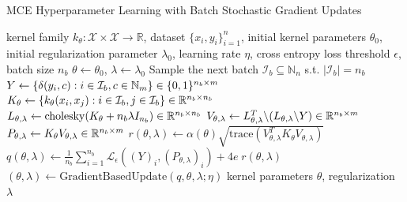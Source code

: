 \documentclass{llncs}
\begin{document}
	\begin{algorithm}[tb]
		\caption{\gls{MCE} Hyperparameter Learning with Batch Stochastic Gradient Updates}
		\label{alg:multiclass_conditional_embedding_training}
		\begin{algorithmic}[1]
			 kernel family $k_{\theta} : \mathcal{X} \times \mathcal{X} \to \mathbb{R}$, dataset $\{x_{i}, y_{i}\}_{i = 1}^{n}$, initial kernel parameters $\theta_{0}$, initial regularization parameter $\lambda_{0}$, learning rate $\eta$, cross entropy loss threshold $\epsilon$, batch size $n_{b}$
			\STATE $\theta \leftarrow \theta_{0}$, $\lambda \leftarrow \lambda_{0}$
			\REPEAT
			\STATE Sample the next batch $\mathcal{I}_{b} \subseteq \mathbb{N}_{n}$ s.t. $| \mathcal{I}_{b} | = n_{b}$ %
			\STATE $Y \leftarrow \{\delta(y_{i}, c) : i \in \mathcal{I}_{b}, c \in \mathbb{N}_{m}\} \hspace{\fill} \in \{0, 1\}^{n_{b} \times m}$
			\STATE $K_{\theta} \leftarrow \{k_{\theta}(x_{i}, x_{j}) : i \in \mathcal{I}_{b}, j \in \mathcal{I}_{b}\} \hspace{\fill} \in \mathbb{R}^{n_{b} \times n_{b}}$
			\STATE $L_{\theta, \lambda} \leftarrow \mathrm{cholesky}(K_{\theta} + n_{b} \lambda I_{n_{b}}) \hspace{\fill} \in \mathbb{R}^{n_{b} \times n_{b}}$
			\STATE $V_{\theta, \lambda} \leftarrow L_{\theta, \lambda}^{T} \backslash (L_{\theta, \lambda} \backslash Y) \hspace{\fill} \in \mathbb{R}^{n_{b} \times m}$
			\STATE $P_{\theta, \lambda} \leftarrow K_{\theta} V_{\theta, \lambda} \hspace{\fill} \in \mathbb{R}^{n_{b} \times m}$
			\STATE$r(\theta, \lambda) \leftarrow \alpha(\theta) \sqrt{\mathrm{trace}(V_{\theta, \lambda}^{T} K_{\theta} V_{\theta, \lambda})}$
			\STATE $q(\theta, \lambda) \leftarrow \frac{1}{n_{b}} \sum_{i = 1}^{n_{b}} \mathcal{L}_{\epsilon}((Y)_{i}, (P_{\theta, \lambda})_{i}) + 4 e \; r(\theta, \lambda)$
			\STATE $(\theta, \lambda) \leftarrow \mathrm{GradientBasedUpdate}(q, \theta, \lambda; \eta)$ %
			 kernel parameters $\theta$, regularization $\lambda$
		\end{algorithmic}
	\end{algorithm}
	
\end{document}
